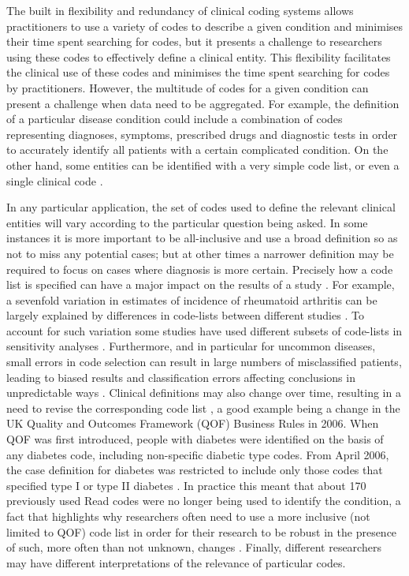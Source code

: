 \documentclass[10pt]{article}
\begin{document}
The built in flexibility and redundancy of clinical coding systems allows practitioners to use a variety of codes to describe a given condition and minimises their time spent searching for codes, but it presents a challenge to researchers using these codes to effectively define a clinical entity.  This flexibility  facilitates the clinical use of these codes and minimises the time spent searching for codes by practitioners. However, the multitude of codes for a given condition can present a challenge when data need to be aggregated. For example, the definition of a particular disease condition could include a combination of codes representing diagnoses, symptoms, prescribed drugs and diagnostic tests in order to accurately identify all patients with a certain complicated condition.  On the other hand, some entities can be identified with a very simple code list, or even a single clinical code \cite{Kotz2011}.


In any particular application, the set of codes used to define the relevant clinical entities will vary according to the particular question being asked. In some instances it is more important to be all-inclusive and use a broad definition so as not to miss any potential cases; but at other times a narrower definition may be required to focus on cases where diagnosis is more certain.  Precisely how a code list is specified can have a major impact on the results of a study \cite{Nicholson2011}. For example, a sevenfold variation in estimates of incidence of rheumatoid arthritis can be largely explained by differences in code-lists between different studies \cite{Garcia2009, Watson2003}.  To account for such variation some studies have used different subsets of code-lists in sensitivity analyses \cite{Doran2011, Herrett2010}.  Furthermore, and in particular for uncommon diseases, small errors in code selection can result in large numbers of misclassified patients, leading to biased results and classification errors affecting conclusions in unpredictable ways \cite{Manuel2010}. Clinical definitions may also change over time, resulting in a need to revise the corresponding code list \cite{Gulliford2009}, a good example being a change in the UK Quality and Outcomes Framework (QOF) Business Rules in 2006. When QOF was first introduced, people with diabetes were identified on the basis of any diabetes code, including non-specific diabetic type codes.  From April 2006, the case definition for diabetes was restricted to include only those codes that specified type I or type II diabetes \cite{Hippisley-Cox2006}.  In practice this meant that about 170 previously used Read codes were no longer being used to identify the condition, a fact that highlights why researchers often need to use a more inclusive (not limited to QOF) code list in order for their research to be robust in the presence of such, more often than not unknown, changes \cite{Kontopantelis2012}. Finally, different researchers may have different interpretations of the relevance of particular codes.
\end{document}
